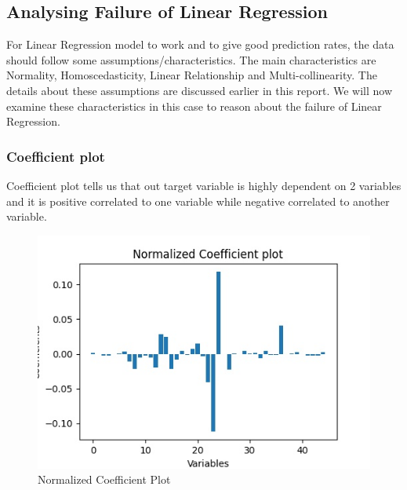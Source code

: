 \documentclass[12pt]{article}
\begin{document}
\subsection{Analysing Failure of Linear Regression}

For Linear Regression model to work and to give good prediction rates, the data should follow some assumptions/characteristics. The main characteristics are Normality, Homoscedasticity, Linear Relationship and Multi-collinearity. The details about these assumptions are discussed earlier in this report. We will now examine these characteristics in this case to reason about the failure of Linear Regression.

\subsubsection{Coefficient plot}
Coefficient plot tells us that out target variable is highly dependent on 2 variables and it is positive correlated to one variable while negative correlated to another variable. \\
\pagebreak
\begin{figure}[h]
\centering
\includegraphics[scale=.99]{images/death/death-coefficient_plot.jpg}
\caption{Normalized Coefficient Plot}
\end{figure}
\end{document}
